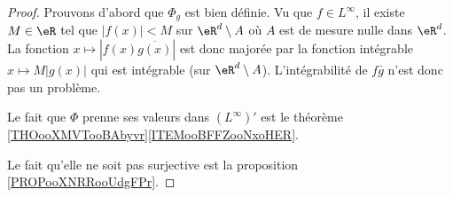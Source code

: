 \begin{proof}
	Prouvons d'abord que \( \Phi_g\) est bien définie. Vu que \( f\in L^{\infty}\), il existe \( M\in \eR\) tel que \( | f(x) |<M\) sur \( \eR^d\setminus A\) où \( A\) est de mesure nulle dans \( \eR^d\). La fonction \( x\mapsto| f(x)\overline{ g(x) } |\) est donc majorée par la fonction intégrable \( x\mapsto M| g(x) |\) qui est intégrable (sur \( \eR^d\setminus A\)). L'intégrabilité de \( f\bar g\) n'est donc pas un problème.

	Le fait que \( \Phi\) prenne ses valeurs dans \( (L^{\infty})'\) est le théorème \ref{THOooXMVTooBAbyvr}\ref{ITEMooBFFZooNxoHER}.

	Le fait qu'elle ne soit pas surjective est la proposition \ref{PROPooXNRRooUdgFPr}.
\end{proof}
